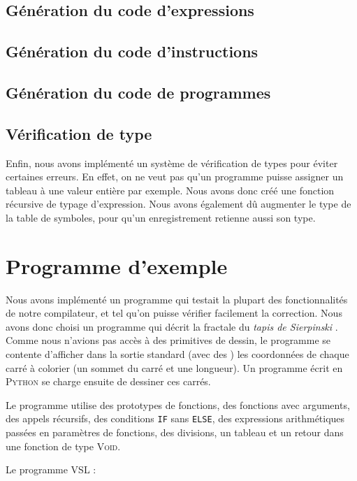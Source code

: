 \documentclass[french]{article}
\begin{document}
  \subsection{Génération du code d'expressions}
  \subsection{Génération du code d'instructions}

  \subsection{Génération du code de programmes}
  \subsection{Vérification de type}
  Enfin, nous avons implémenté un système de vérification de types pour éviter certaines erreurs. En effet, on ne veut pas qu'un programme puisse assigner un tableau à une valeur entière par exemple. Nous avons donc créé une fonction récursive de typage d'expression. Nous avons également dû augmenter le type de la table de symboles, pour qu'un enregistrement retienne aussi son type.

  
\section{Programme d'exemple}
Nous avons implémenté un programme qui testait la plupart des fonctionnalités de notre compilateur, et tel qu'on puisse vérifier facilement la correction. Nous avons donc choisi un programme qui décrit la fractale du \textit{tapis de Sierpinski} . Comme nous n'avions pas accès à des primitives de dessin, le programme se contente d'afficher dans la sortie standard (avec des \iprint) les coordonnées de chaque carré à colorier (un sommet du carré et une longueur). Un programme écrit en \textsc{Python} se charge ensuite de dessiner ces carrés.

Le programme utilise des prototypes de fonctions, des fonctions avec arguments, des appels récursifs, des conditions \texttt{IF} sans \texttt{ELSE}, des expressions arithmétiques passées en paramètres de fonctions, des divisions, un tableau et un retour dans une fonction de type \textsc{Void}.

Le programme \textsc{VSL} :

\end{document}
